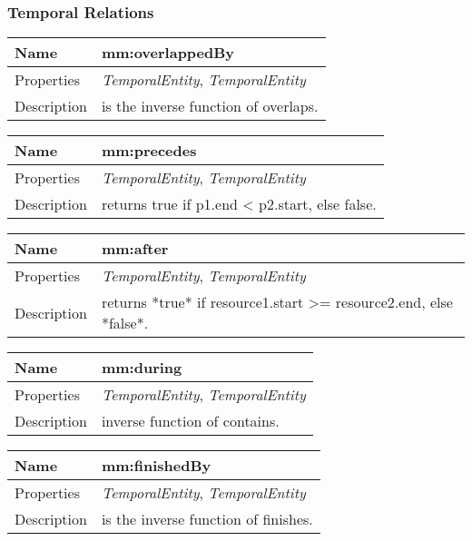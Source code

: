 \subsubsection*{Temporal Relations}
\begin{tabular}{|p{3cm}|p{10cm}|}
\hline Name & mm:overlappedBy\\
\hline Properties & \textit{TemporalEntity}, \textit{TemporalEntity} \\
\hline Description & is the inverse function of overlaps.\\
\hline
\end{tabular}
\vspace{0.3cm}
\newline
\begin{tabular}{|p{3cm}|p{10cm}|}
\hline Name & mm:precedes\\
\hline Properties & \textit{TemporalEntity}, \textit{TemporalEntity} \\
\hline Description & returns true if p1.end < p2.start, else false.\\
\hline
\end{tabular}
\vspace{0.3cm}
\newline
\begin{tabular}{|p{3cm}|p{10cm}|}
\hline Name & mm:after\\
\hline Properties & \textit{TemporalEntity}, \textit{TemporalEntity} \\
\hline Description & returns *true* if resource1.start >= resource2.end, else *false*.\\
\hline
\end{tabular}
\vspace{0.3cm}
\newline
\begin{tabular}{|p{3cm}|p{10cm}|}
\hline Name & mm:during\\
\hline Properties & \textit{TemporalEntity}, \textit{TemporalEntity} \\
\hline Description & inverse function of contains.\\
\hline
\end{tabular}
\vspace{0.3cm}
\newline
\begin{tabular}{|p{3cm}|p{10cm}|}
\hline Name & mm:finishedBy\\
\hline Properties & \textit{TemporalEntity}, \textit{TemporalEntity} \\
\hline Description & is the inverse function of finishes.\\
\hline
\end{tabular}
